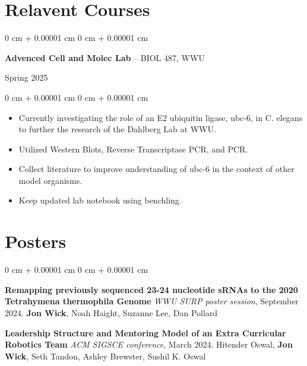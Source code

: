 \documentclass[10pt, letterpaper]{article}
\newenvironment{highlights}{
    \begin{itemize}[
        topsep=0.10 cm,
        parsep=0.10 cm,
        partopsep=0pt,
        itemsep=0pt,
        leftmargin=0 cm + 10pt
    ]
}{
    \end{itemize}
} %
\newenvironment{onecolentry}{
    \begin{adjustwidth}{
        0 cm + 0.00001 cm
    }{
        0 cm + 0.00001 cm
    }
}{
    \end{adjustwidth}
} %
\newenvironment{twocolentry}[2][]{
    \onecolentry
    \def\secondColumn{#2}
    \setcolumnwidth{\fill, 4.5 cm}
    \begin{paracol}{2}
}{
    \switchcolumn \raggedleft \secondColumn
    \end{paracol}
    \endonecolentry
} %
\begin{document}
    \section{Relavent Courses}

    \begin{samepage}
    \begin{twocolentry}
      {Spring 2025}
      \textbf{Advenced Cell and Molec Lab} -- BIOL 487, WWU
    \end{twocolentry}
      \begin{onecolentry}
        \begin{highlights}
        \item Currently investigating the role of an E2 ubiquitin ligase, ubc-6, in C. elegans to further the research of the Dahlberg Lab at WWU.
        \item Utilized Western Blots, Reverse Transcriptase PCR, and PCR.
        \item Collect literature to improve understanding of ubc-6 in the context of other model organisms.
        \item Keep updated lab notebook using benchling.
        \end{highlights}
      \end{onecolentry}


    \end{samepage}

    \section{Posters}





        \begin{onecolentry}
          \textbf{Remapping previously sequenced 23-24 nucleotide sRNAs to the 2020 Tetrahymena thermophila Genome}\newline
          \textit{WWU SURP poster session}, September 2024. \newline
          \textbf{Jon Wick}, Noah Haight, Suzanne Lee, Dan Pollard

          \vspace{0.2cm}

          \textbf{Leadership Structure and Mentoring Model of an Extra Curricular Robotics Team} \newline
          \textit{ACM SIGSCE conference}, March 2024.\newline
          Hitender Oswal, \textbf{Jon Wick}, Seth Tandon, Ashley Brewster, Sushil K. Oswal


        \end{onecolentry}
\end{document}
